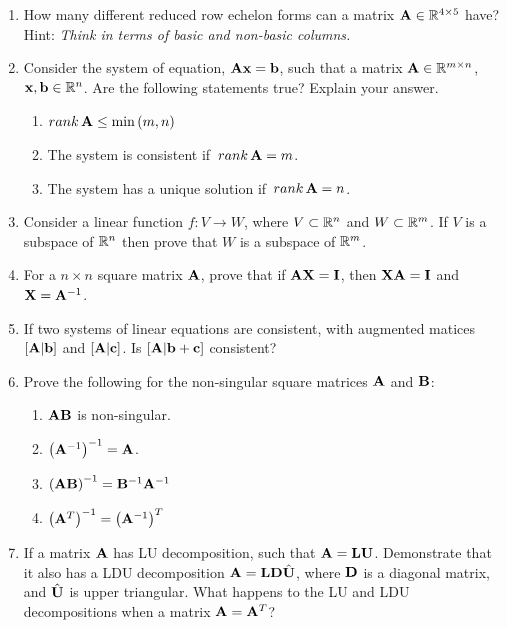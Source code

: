 \begin{enumerate}[resume]
    \item How many different reduced row echelon forms can a matrix $\mathbf{A} \in \mathbb{R}^{4 \times 5}$ have? Hint: \emph{Think in terms of basic and non-basic columns.}

    \item Consider the system of equation, $\mathbf{Ax} = \mathbf{b}$, such that a matrix $\mathbf{A} \in \mathbb{R}^{m \times n}$, $\mathbf{x}, \mathbf{b} \in \mathbb{R}^n$. Are the following statements true? Explain your answer.
    \begin{enumerate}
        \item $rank\,\mathbf{A} \leq \min \left( m, n \right)$
        \item The system is consistent if $\,rank\,\mathbf{A} = m$.
        \item The system has a unique solution if $\,rank\,\mathbf{A} = n$.
    \end{enumerate}

    \item Consider a linear function $f: V \to W$, where $V \subset \mathbb{R}^n$ and $W \subset \mathbb{R}^m$. If $V$ is a subspace of $\mathbb{R}^n$ then prove that $W$ is a subspace of $\mathbb{R}^m$.   

    \item For a $n \times n$ square matrix $\mathbf{A}$, prove that if $\mathbf{A}\mathbf{X} = \mathbf{I}$, then $\mathbf{X}\mathbf{A} = \mathbf{I}$ and $\mathbf{X} = \mathbf{A}^{-1}$.

    \item If two systems of linear equations are consistent, with augmented matices $\left[ \mathbf{A} | \mathbf{b}\right]$ and $\left[ \mathbf{A} | \mathbf{c}\right]$. Is $\left[ \mathbf{A} | \mathbf{b} + \mathbf{c}\right]$ consistent?

    \item Prove the following for the non-singular square matrices $\mathbf{A}$ and $\mathbf{B}$:
    \begin{enumerate}
        \item $\mathbf{A}\mathbf{B}$ is non-singular.
        \item $\left( \mathbf{A}^{-1}\right)^{-1} = \mathbf{A}$.
        \item $\left( \mathbf{A}\mathbf{B}\right)^{-1} = \mathbf{B}^{-1}\mathbf{A}^{-1}$
        \item $\left( \mathbf{A}^T\right)^{-1} = \left( \mathbf{A}^{-1}\right)^T$
    \end{enumerate}

    \item If a matrix $\mathbf{A}$ has LU decomposition, such that $\mathbf{A} = \mathbf{LU}$. Demonstrate that it also has a LDU decomposition $\mathbf{A} = \mathbf{LD}\hat{\mathbf{U}}$, where $\mathbf{D}$ is a diagonal matrix, and $\hat{\mathbf{U}}$ is upper triangular. What happens to the LU and LDU decompositions when a matrix $\mathbf{A} = \mathbf{A}^T$?


\end{enumerate}
